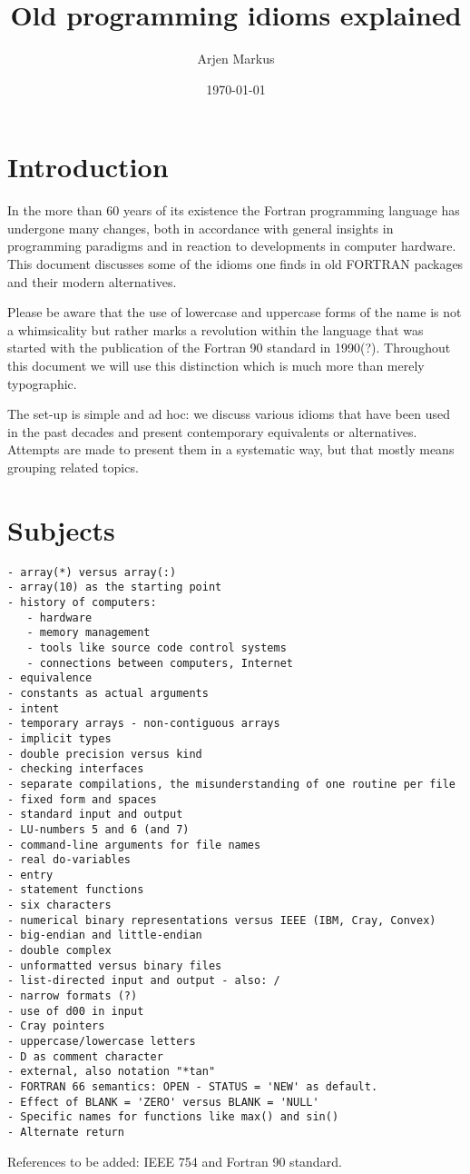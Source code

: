 \documentclass{article}
\date{\today}
\author{Arjen Markus}
\title{Old programming idioms explained}
\begin{document}
\maketitle

\section{Introduction}
In the more than 60 years of its existence the Fortran programming
language has undergone many changes, both in accordance with general insights
in programming paradigms and in reaction to developments in computer hardware.
This document discusses some of the idioms one finds in old FORTRAN packages
and their modern alternatives.

Please be aware that the use of lowercase and uppercase forms of the name is
not a whimsicality but rather marks a revolution within the language that was
started with the publication of the Fortran 90 standard in 1990(?). Throughout
this document we will use this distinction which is much more than merely
typographic.

The set-up is simple and ad hoc: we discuss various idioms that have been
used in the past decades and present contemporary equivalents or alternatives.
Attempts are made to present them in a systematic way, but that mostly means grouping
related topics.






\section{Subjects}
\begin{verbatim}
- array(*) versus array(:)
- array(10) as the starting point
- history of computers:
   - hardware
   - memory management
   - tools like source code control systems
   - connections between computers, Internet
- equivalence
- constants as actual arguments
- intent
- temporary arrays - non-contiguous arrays
- implicit types
- double precision versus kind
- checking interfaces
- separate compilations, the misunderstanding of one routine per file
- fixed form and spaces
- standard input and output
- LU-numbers 5 and 6 (and 7)
- command-line arguments for file names
- real do-variables
- entry
- statement functions
- six characters
- numerical binary representations versus IEEE (IBM, Cray, Convex)
- big-endian and little-endian
- double complex
- unformatted versus binary files
- list-directed input and output - also: /
- narrow formats (?)
- use of d00 in input
- Cray pointers
- uppercase/lowercase letters
- D as comment character
- external, also notation "*tan"
- FORTRAN 66 semantics: OPEN - STATUS = 'NEW' as default.
- Effect of BLANK = 'ZERO' versus BLANK = 'NULL'
- Specific names for functions like max() and sin()
- Alternate return
\end{verbatim}


References to be added: IEEE 754 and Fortran 90 standard.
\end{document}
